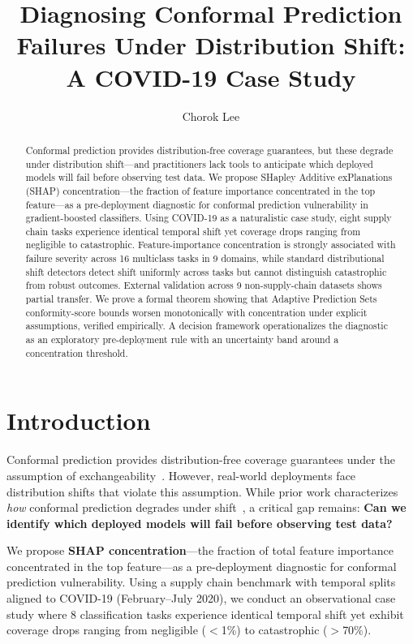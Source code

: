 \documentclass{uai2026} %
\title{Diagnosing Conformal Prediction Failures Under Distribution Shift:\\A COVID-19 Case Study}
\author[1]{Chorok Lee}
\affil[1]{%
    Korea Advanced Institute of Science and Technology (KAIST)\\
    Daejeon, South Korea
}
\begin{document}
\maketitle

\begin{abstract}
Conformal prediction provides distribution-free coverage guarantees, but these degrade under distribution shift---and practitioners lack tools to anticipate which deployed models will fail before observing test data.
We propose SHapley Additive exPlanations (SHAP) concentration---the fraction of feature importance concentrated in the top feature---as a pre-deployment diagnostic for conformal prediction vulnerability in gradient-boosted classifiers.
Using COVID-19 as a naturalistic case study, eight supply chain tasks experience identical temporal shift yet coverage drops ranging from negligible to catastrophic.
Feature-importance concentration is strongly associated with failure severity across 16 multiclass tasks in 9 domains, while standard distributional shift detectors detect shift uniformly across tasks but cannot distinguish catastrophic from robust outcomes.
External validation across 9 non-supply-chain datasets shows partial transfer.
We prove a formal theorem showing that Adaptive Prediction Sets conformity-score bounds worsen monotonically with concentration under explicit assumptions, verified empirically.
A decision framework operationalizes the diagnostic as an exploratory pre-deployment rule with an uncertainty band around a concentration threshold.
\end{abstract}

\section{Introduction}\label{sec:intro}

Conformal prediction provides distribution-free coverage guarantees under the assumption of exchangeability~\citep{vovk2005algorithmic}. However, real-world deployments face distribution shifts that violate this assumption. While prior work characterizes \textit{how} conformal prediction degrades under shift~\citep{tibshirani2019conformal, barber2023conformal}, a critical gap remains: \textbf{Can we identify which deployed models will fail before observing test data?}

We propose \textbf{SHAP concentration}---the fraction of total feature importance concentrated in the top feature---as a pre-deployment diagnostic for conformal prediction vulnerability. Using a supply chain benchmark with temporal splits aligned to COVID-19 (February--July 2020), we conduct an observational case study where 8 classification tasks experience identical temporal shift yet exhibit coverage drops ranging from negligible ($<$1\%) to catastrophic ($>$70\%).
\end{document}
